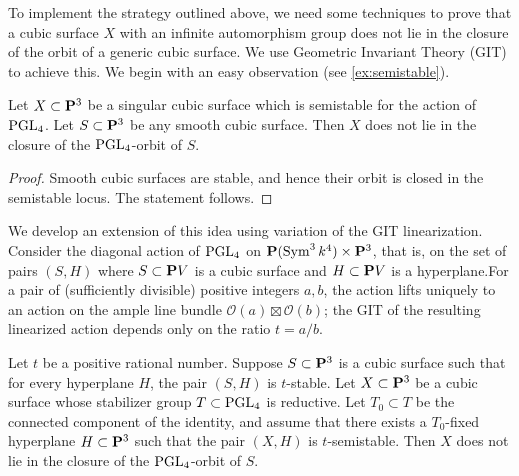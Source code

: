 \documentclass[12pt,reqno]{amsart}
\renewcommand{\k}{k}
\numberwithin{equation}{section}
\begin{document}
To implement the strategy outlined above, we need some techniques to prove that a cubic surface $X$ with an infinite automorphism group does not lie in the closure of the orbit of a generic cubic surface.
We use Geometric Invariant Theory (GIT) to achieve this.
We begin with an easy observation (see \autoref{ex:semistable}).
\begin{proposition}
  Let $X \subset \P^3$ be a singular cubic surface which is semistable for the action of $\PGL_4$.
  Let $S \subset \P^3$ be any smooth cubic surface.
  Then $X$ does not lie in the closure of the $\PGL_4$-orbit of $S$.
\end{proposition}
\begin{proof}
  Smooth cubic surfaces are stable, and hence their orbit is closed in the semistable locus.  The statement follows.
\end{proof}

We develop an extension of this idea using variation of the GIT linearization.
Consider the diagonal action
of $\PGL_4$ on $\P(\Sym^3 \k^4) \times \P^3$, that is, on the set of pairs $(S, H)$ where $S \subset \P V$ is a cubic surface and $H \subset \P V$ is a hyperplane.For a pair of (sufficiently divisible) positive integers $a, b$, the action lifts uniquely to an action on the ample
line bundle $\mathcal O(a)\boxtimes \mathcal O(b)$; the GIT of the
resulting linearized action depends only on the ratio $t = a/b$.

\begin{proposition}\label{prop:nolimit}
  Let $t$ be a positive rational number.
  Suppose $S \subset \P^3$ is a cubic surface such that for every hyperplane $H$, the pair $(S,H)$ is $t$-stable.
  Let $X \subset \P^3$ be a cubic surface whose stabilizer group $T \subset \PGL_4$ is reductive.
  Let $T_0 \subset T$ be the connected component of the identity, and assume that there exists a $T_0$-fixed hyperplane $H \subset \P^3$ such that the pair $(X, H)$ is $t$-semistable.
  Then $X$ does not lie in the closure of the $\PGL_4$-orbit of $S$.
\end{proposition}
\end{document}
